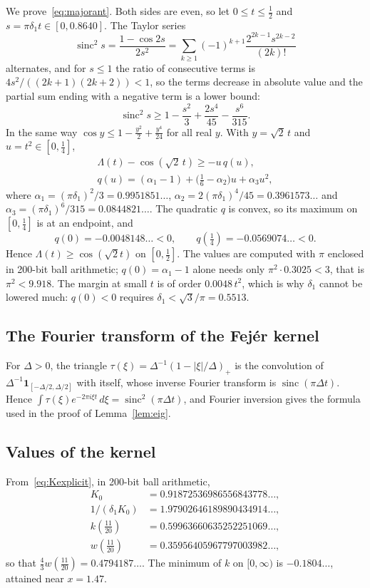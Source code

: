 \documentclass[aps,prd,twocolumn,superscriptaddress,nofootinbib,longbibliography,floatfix,showkeys,amsmath,amssymb,10pt]{revtex4-2}
\theoremstyle{definition}
\theoremstyle{remark}
\newcommand{\sinc}{\operatorname{sinc}}
\begin{document}
We prove~\eqref{eq:majorant}. Both sides are even, so let
$0\le t\le\frac12$ and $s=\pi\delta_1t\in[0,0.8640]$. The Taylor series
\[
 \sinc^2s=\frac{1-\cos2s}{2s^2}=\sum_{k\ge1}(-1)^{k+1}
 \frac{2^{2k-1}s^{2k-2}}{(2k)!}
\]
alternates, and for $s\le1$ the ratio of consecutive terms is
$4s^2/((2k+1)(2k+2))<1$, so the terms decrease in absolute value and the
partial sum ending with a negative term is a lower bound:
\[
 \sinc^2s\ge1-\frac{s^2}3+\frac{2s^4}{45}-\frac{s^6}{315}.
\]
In the same way $\cos y\le1-\frac{y^2}2+\frac{y^4}{24}$ for all real $y$.
With $y=\sqrt2\,t$ and $u=t^2\in[0,\frac14]$,
\begin{gather*}
 \Lambda(t)-\cos(\sqrt2\,t)\ge-u\,q(u),\\
 q(u)=(\alpha_1-1)+\bigl(\tfrac16-\alpha_2\bigr)u+\alpha_3u^2,
\end{gather*}
where $\alpha_1=(\pi\delta_1)^2/3=0.9951851\ldots$,
$\alpha_2=2(\pi\delta_1)^4/45=0.3961573\ldots$ and
$\alpha_3=(\pi\delta_1)^6/315=0.0844821\ldots$. The quadratic $q$ is convex,
so its maximum on $[0,\frac14]$ is at an endpoint, and
\[
 q(0)=-0.0048148\ldots<0,\qquad q(\tfrac14)=-0.0569074\ldots<0.
\]
Hence $\Lambda(t)\ge\cos(\sqrt2t)$ on $[0,\frac12]$. The values are computed
with $\pi$ enclosed in 200-bit ball arithmetic; $q(0)=\alpha_1-1$ alone
needs only $\pi^2\cdot0.3025<3$, that is $\pi^2<9.918$. The margin at small
$t$ is of order $0.0048\,t^2$, which is why $\delta_1$ cannot be lowered
much: $q(0)<0$ requires $\delta_1<\sqrt3/\pi=0.5513$.

\subsection{The Fourier transform of the Fej\'er kernel}

For $\Delta>0$, the triangle $\tau(\xi)=\Delta^{-1}(1-|\xi|/\Delta)_+$ is
the convolution of $\Delta^{-1}\mathbf 1_{[-\Delta/2,\Delta/2]}$ with itself,
whose inverse Fourier transform is $\sinc(\pi\Delta t)$. Hence
$\int\tau(\xi)e^{-2\pi i\xi t}\,d\xi=\sinc^2(\pi\Delta t)$, and Fourier
inversion gives the formula used in the proof of Lemma~\ref{lem:eig}.

\subsection{Values of the kernel}

From~\eqref{eq:Kexplicit}, in 200-bit ball arithmetic,
\begin{align*}
 K_0&=0.91872536986556843778\ldots,\\
 1/(\delta_1K_0)&=1.97902646189890434914\ldots,\\
 k(\tfrac{11}{20})&=0.59963660635252251069\ldots,\\
 w(\tfrac{11}{20})&=0.35956405967797003982\ldots,
\end{align*}
so that $\frac43w(\frac{11}{20})=0.4794187\ldots$. The minimum of $k$ on
$[0,\infty)$ is $-0.1804\ldots$, attained near $x=1.47$.
\end{document}

